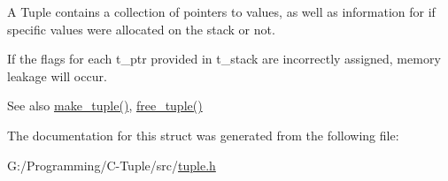 A Tuple contains a collection of pointers to values, as well as information for if specific values were allocated on the stack or not.

If the flags for each t\+\_\+ptr provided in t\+\_\+stack are incorrectly assigned, memory leakage will occur.

\begin{DoxySeeAlso}{See also}
\hyperlink{tuple_8h_a7c18a9b99b81dc06281da4ef9b07f21c}{make\+\_\+tuple()}, \hyperlink{tuple_8h_a2f58dd54e26e4c82baf1477651176992}{free\+\_\+tuple()} 
\end{DoxySeeAlso}


The documentation for this struct was generated from the following file\+:\begin{DoxyCompactItemize}
\item 
G\+:/\+Programming/\+C-\/\+Tuple/src/\hyperlink{tuple_8h}{tuple.\+h}\end{DoxyCompactItemize}
